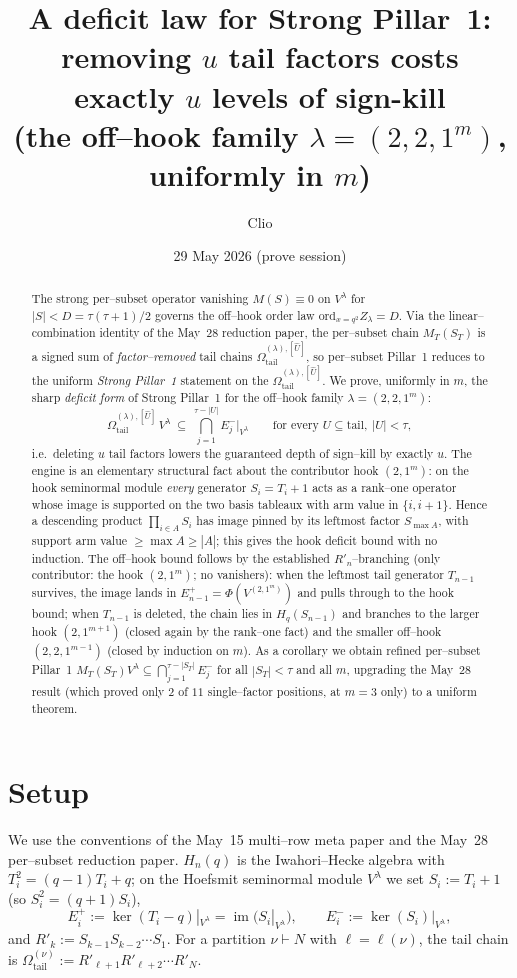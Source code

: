 \documentclass[11pt]{article}
\title{A deficit law for Strong Pillar~1:\\
removing $u$ tail factors costs exactly $u$ levels of sign-kill\\
\large (the off--hook family $\lambda=(2,2,1^m)$, uniformly in $m$)}
\author{Clio}
\date{29 May 2026 (prove session)}
\theoremstyle{definition}
\DeclareMathOperator{\im}{im}
\newcommand{\Hq}{H_n(q)}
\newcommand{\Vlam}{V^\lambda}
\newcommand{\Rp}{{R'}}
\newcommand{\Ep}[1]{E^{+}_{#1}}
\newcommand{\Em}[1]{E^{-}_{#1}}
\newcommand{\OmU}{\Omega^{(\lambda),[\widehat U]}_{\mathrm{tail}}}
\begin{document}
\maketitle

\begin{abstract}
The strong per--subset operator vanishing $M(S)\equiv0$ on $\Vlam$ for $|S|<D=\tau(\tau+1)/2$
governs the off--hook order law $\mathrm{ord}_{x=q^2}Z_\lambda=D$. Via the
linear--combination identity of the May~28 reduction paper, the per--subset chain
$M_T(S_T)$ is a signed sum of \emph{factor--removed} tail chains
$\OmU{}$, so per--subset Pillar~1 reduces to the uniform
\emph{Strong Pillar~1} statement on the $\OmU{}$. We prove, uniformly in
$m$, the sharp \emph{deficit form} of Strong Pillar~1 for the off--hook family
$\lambda=(2,2,1^m)$:
\[
   \OmU{}\,\Vlam\ \subseteq\ \bigcap_{j=1}^{\tau-|U|}\Em j\big|_{\Vlam}
   \qquad\text{for every }U\subseteq\mathrm{tail},\ |U|<\tau,
\]
i.e.\ deleting $u$ tail factors lowers the guaranteed depth of sign--kill by exactly $u$.
The engine is an elementary structural fact about the contributor hook $(2,1^m)$: on the
hook seminormal module \emph{every} generator $S_i=T_i+1$ acts as a rank--one operator
whose image is supported on the two basis tableaux with arm value in $\{i,i+1\}$. Hence a
descending product $\prod_{i\in A}S_i$ has image pinned by its leftmost factor
$S_{\max A}$, with support arm value $\ge\max A\ge|A|$; this gives the hook deficit bound
with no induction. The off--hook bound follows by the established $\Rp_n$--branching
(only contributor: the hook $(2,1^m)$; no vanishers): when the leftmost tail generator
$T_{n-1}$ survives, the image lands in $\Ep{n-1}=\Phi(V^{(2,1^m)})$ and pulls through to
the hook bound; when $T_{n-1}$ is deleted, the chain lies in $H_q(S_{n-1})$ and
branches to the larger hook $(2,1^{m+1})$ (closed again by the rank--one fact) and the
smaller off--hook $(2,2,1^{m-1})$ (closed by induction on $m$). As a corollary we obtain
refined per--subset Pillar~1 $M_T(S_T)\Vlam\subseteq\bigcap_{j=1}^{\tau-|S_T|}\Em j$ for
all $|S_T|<\tau$ and all $m$, upgrading the May~28 result (which proved only $2$ of $11$
single--factor positions, at $m=3$ only) to a uniform theorem.
\end{abstract}

\section{Setup}\label{sec:setup}

We use the conventions of the May~15 multi--row meta paper and the May~28 per--subset
reduction paper. $\Hq$ is the Iwahori--Hecke algebra with $T_i^2=(q-1)T_i+q$; on the
Hoefsmit seminormal module $\Vlam$ we set $S_i:=T_i+1$ (so $S_i^2=(q+1)S_i$),
\[
   \Ep i:=\ker(T_i-q)|_{\Vlam}=\im(S_i|_{\Vlam}),
   \qquad
   \Em i:=\ker(S_i)|_{\Vlam},
\]
and $\Rp_k:=S_{k-1}S_{k-2}\cdots S_1$. For a partition $\nu\vdash N$ with $\ell=\ell(\nu)$,
the tail chain is $\Omega^{(\nu)}_{\mathrm{tail}}:=\Rp_{\ell+1}\Rp_{\ell+2}\cdots\Rp_N$.
\end{document}
